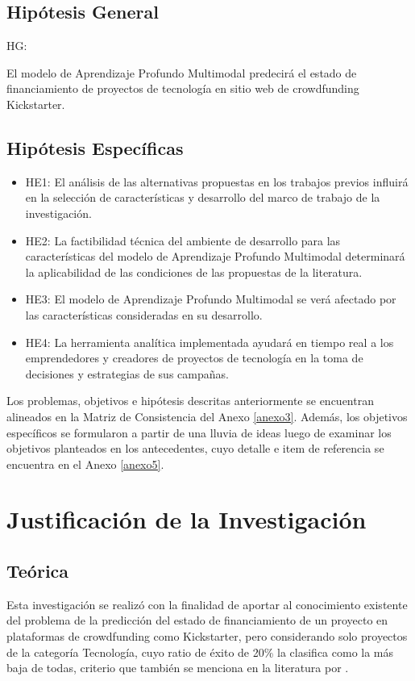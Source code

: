 \subsection{Hipótesis General}
HG: \newcommand{\HipotesisGeneral}{
	El modelo de Aprendizaje Profundo Multimodal predecirá el estado de financiamiento de proyectos de tecnología en sitio web de crowdfunding Kickstarter.
}
\HipotesisGeneral
\subsection{Hipótesis Específicas}
\newcommand{\Hone}{
El análisis de las alternativas propuestas en los trabajos previos influirá en la selección de características y desarrollo del marco de trabajo de la investigación.
}
\newcommand{\Htwo}{
La factibilidad técnica del ambiente de desarrollo para las características del modelo de Aprendizaje Profundo Multimodal determinará la aplicabilidad de las condiciones de las propuestas de la literatura.
}
\newcommand{\Hthree}{
El modelo de Aprendizaje Profundo Multimodal se verá afectado por las características consideradas en su desarrollo.
}
\newcommand{\Hfour}{
La herramienta analítica implementada ayudará en tiempo real a los emprendedores y creadores de proyectos de tecnología en la toma de decisiones y estrategias de sus campañas.
}

\begin{itemize}
	\item HE1: \Hone
	\item HE2: \Htwo
	\item HE3: \Hthree
	\item HE4: \Hfour
\end{itemize}

Los problemas, objetivos e hipótesis descritas anteriormente se encuentran alineados en la Matriz de Consistencia del Anexo \ref{anexo3}. Además, los objetivos específicos se formularon a partir de una lluvia de ideas luego de examinar los objetivos planteados en los antecedentes, cuyo detalle e item de referencia se encuentra en el Anexo \ref{anexo5}.

\section{Justificación de la Investigación}

\subsection{Teórica}
Esta investigación se realizó con la finalidad de aportar al conocimiento existente del problema de la predicción del estado de financiamiento de un proyecto en plataformas de crowdfunding como Kickstarter, pero considerando solo proyectos de la categoría Tecnología, cuyo ratio de éxito de 20\% la clasifica como la más baja de todas, criterio que también se menciona en la literatura por \cite{pr_lee2018contentDL}.

